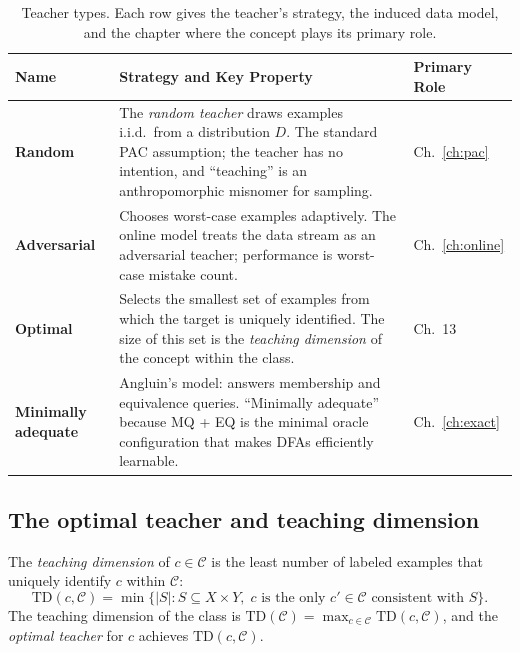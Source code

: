 \begin{table}[ht]
\centering
\small
\caption{Teacher types. Each row gives the teacher's strategy, the induced data model, and the chapter where the concept plays its primary role.}
\label{tab:teacher-types}
\begin{tabularx}{\textwidth}{>{\bfseries\small}l X l}
\toprule
\textbf{Name} & \textbf{Strategy and Key Property} & \textbf{Primary Role} \\
\midrule
Random &
  The \emph{random teacher}\index{random teacher} draws examples i.i.d.\ from a distribution $D$. The standard PAC assumption; the teacher has no intention, and ``teaching'' is an anthropomorphic misnomer for sampling. &
  Ch.~\ref{ch:pac} \\[4pt]

Adversarial &
  Chooses worst-case examples adaptively. The online model treats the data stream as an adversarial teacher; performance is worst-case mistake count. &
  Ch.~\ref{ch:online} \\[4pt]

Optimal &
  Selects the smallest set of examples from which the target is uniquely identified. The size of this set is the \emph{teaching dimension} of the concept within the class. &
  Ch.~13 \\[4pt]

Minimally adequate &
  Angluin's model: answers membership and equivalence queries. ``Minimally adequate'' because MQ + EQ is the minimal oracle configuration that makes DFAs efficiently learnable. &
  Ch.~\ref{ch:exact} \\[4pt]
\bottomrule
\end{tabularx}
\end{table}

\subsection{The optimal teacher and teaching dimension}

\begin{defn}
\label{def:teaching-dim}
The \emph{teaching dimension} of $c \in \mathcal{C}$ is the least number of labeled examples that uniquely identify $c$ within $\mathcal{C}$:
\[
\mathrm{TD}(c, \mathcal{C}) = \min\{|S| : S \subseteq X \times Y,\; c \text{ is the only } c' \in \mathcal{C} \text{ consistent with } S\}.
\]
The teaching dimension of the class is $\mathrm{TD}(\mathcal{C}) = \max_{c \in \mathcal{C}} \mathrm{TD}(c, \mathcal{C})$, and the \emph{optimal teacher} for $c$ achieves $\mathrm{TD}(c, \mathcal{C})$.
\end{defn}

